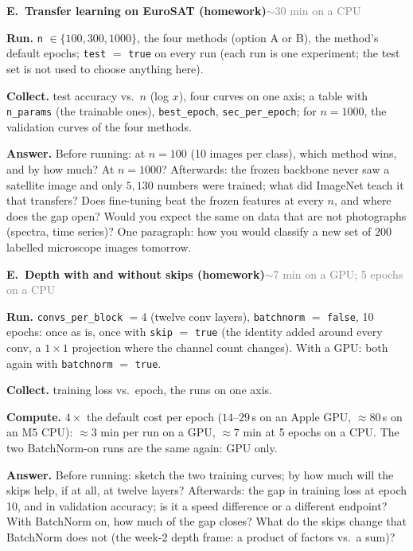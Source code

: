 \documentclass[11pt]{article}
\newcommand{\code}[1]{\texttt{#1}}
\newcounter{exp}
\newenvironment{experiment}[2]{\refstepcounter{exp}\par\medskip
  \textbf{\textcolor{aiblue}{E\theexp.\ #1}}\hfill{\small\textcolor{gray}{#2}}\par}{\par}
\newcommand{\run}[1]{\textbf{Run.} #1\par}
\newcommand{\collect}[1]{\textbf{Collect.} #1\par}
\newcommand{\answer}[1]{\textbf{Answer.} #1\par}
\newcommand{\heavy}[1]{\textcolor{gray!70!black}{\textbf{Compute.} #1}\par}
\begin{document}
\begin{experiment}{Transfer learning on EuroSAT (homework)}{$\sim$30 min on a CPU}
\run{\code{n} $\in\{100, 300, 1000\}$, the four methods (option A or B), the method's default epochs; \code{test} $=$ \code{true} on every run (each run is one experiment; the test set is not used to choose anything here).}
\collect{test accuracy vs.\ $n$ (log $x$), four curves on one axis; a table with \code{n\_params} (the trainable ones), \code{best\_epoch}, \code{sec\_per\_epoch}; for $n=1000$, the validation curves of the four methods.}
\answer{Before running: at $n=100$ (10 images per class), which method wins, and by how much? At $n=1000$? Afterwards: the frozen backbone never saw a satellite image and only $5{,}130$ numbers were trained; what did ImageNet teach it that transfers? Does fine-tuning beat the frozen features at every $n$, and where does the gap open? Would you expect the same on data that are not photographs (spectra, time series)? One paragraph: how you would classify a new set of $200$ labelled microscope images tomorrow.}
\end{experiment}

\begin{experiment}{Depth with and without skips (homework)}{$\sim$7 min on a GPU; 5 epochs on a CPU}
\run{\code{convs\_per\_block} $=4$ (twelve conv layers), \code{batchnorm} $=$ \code{false}, 10 epochs: once as is, once with \code{skip} $=$ \code{true} (the identity added around every conv, a $1\times1$ projection where the channel count changes). With a GPU: both again with \code{batchnorm} $=$ \code{true}.}
\collect{training loss vs.\ epoch, the runs on one axis.}
\heavy{$4\times$ the default cost per epoch ($14$--$29$\,s on an Apple GPU, $\approx80$\,s on an M5 CPU): $\approx3$ min per run on a GPU, $\approx7$ min at 5 epochs on a CPU. The two BatchNorm-on runs are the same again: GPU only.}
\answer{Before running: sketch the two training curves; by how much will the skips help, if at all, at twelve layers? Afterwards: the gap in training loss at epoch 10, and in validation accuracy; is it a speed difference or a different endpoint? With BatchNorm on, how much of the gap closes? What do the skips change that BatchNorm does not (the week-2 depth frame: a product of factors vs.\ a sum)?}
\end{experiment}
\end{document}

